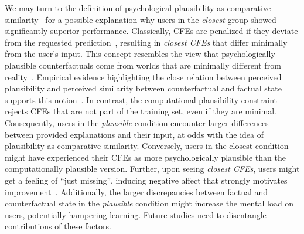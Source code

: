 We may turn to the definition of psychological plausibility as comparative similarity~\citep{lewis_counterfactuals_1973, stanley_counterfactual_2017} for a possible explanation why users in the \textit{closest} group showed significantly superior performance. 
Classically, \glspl{CFE} are penalized if they deviate from the requested prediction~\citep{wachter_counterfactual_2017}, resulting in \textit{closest \glspl{CFE}} that differ minimally from the user's input.
This concept resembles the view that psychologically plausible counterfactuals come from worlds that are minimally different from reality~\citep{lewis_counterfactuals_1973}.
Empirical evidence highlighting the close relation between perceived plausibility and perceived similarity between counterfactual and factual state supports this notion~\citep{stanley_counterfactual_2017, de_brigard_perceived_2021}.
In contrast, the computational plausibility constraint rejects \glspl{CFE} that are not part of the training set, even if they are minimal.
Consequently, users in the \textit{plausible} condition encounter larger differences between provided explanations and their input, at odds with the idea of plausibility as comparative similarity.
Conversely, users in the closest condition might have experienced their \glspl{CFE} as more psychologically plausible than the computationally plausible version.
Further, upon seeing \textit{closest \glspl{CFE}}, users might get a feeling of ``just missing'', inducing negative affect that strongly motivates improvement~\citep{medvec_when_1997, markman_reflection_2003}.
Additionally, the larger discrepancies between factual and counterfactual state in the \textit{plausible} condition might increase the mental load on users, potentially hampering learning.
Future studies need to disentangle contributions of these factors.

